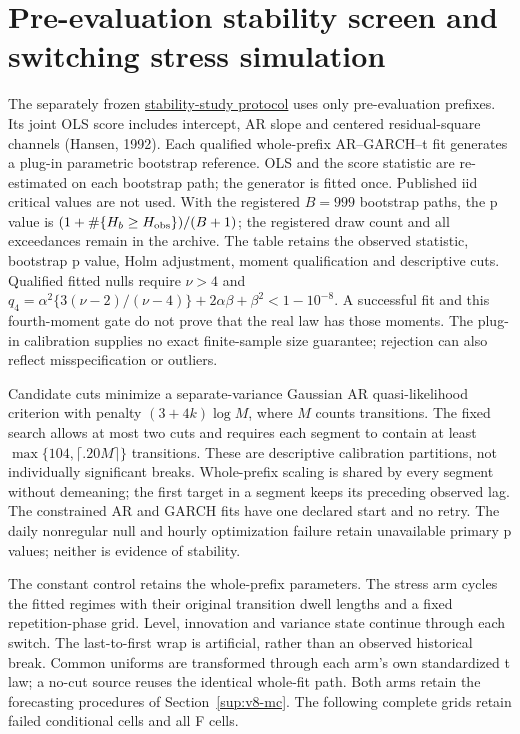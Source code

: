 \section{Pre-evaluation stability screen and switching stress simulation}\label{sup:v9-stability}

The separately frozen
\href{https://github.com/ByronLi0207/financial-mathematics-paper-20261020/blob/revision-v9/protocol/v9/nonstationarity-design.md}{stability-study protocol}
uses only pre-evaluation prefixes. Its joint OLS score includes intercept,
AR slope and centered residual-square channels (Hansen, 1992).
Each qualified whole-prefix AR--GARCH--t fit generates a plug-in parametric
bootstrap reference. OLS and the score statistic are re-estimated on each
bootstrap path; the generator is fitted once. Published iid critical values
are not used. With the registered \(B=999\) bootstrap paths, the p value is
\((1+\#\{H_b\ge H_{\rm obs}\})/(B+1)\); the registered draw count and
all exceedances remain in the archive. The table retains the observed statistic,
bootstrap p value, Holm adjustment, moment qualification and descriptive cuts.
Qualified fitted nulls require \(\nu>4\) and
\(q_4=\alpha^2\{3(\nu-2)/(\nu-4)\}+2\alpha\beta+\beta^2<1-10^{-8}\).
A successful fit and this fourth-moment gate do not prove that the real law
has those moments. The plug-in calibration supplies no exact finite-sample
size guarantee; rejection can also reflect misspecification or outliers.



Candidate cuts minimize a separate-variance Gaussian AR quasi-likelihood
criterion with penalty \((3+4k)\log M\), where \(M\) counts transitions.
The fixed search allows at most two cuts and requires each segment to contain
at least \(\max\{104,\lceil .20M\rceil\}\) transitions.
These are descriptive calibration partitions, not individually significant
breaks. Whole-prefix scaling is shared by every segment without demeaning;
the first target in a segment keeps its preceding observed lag.
The constrained AR and GARCH fits have one declared start and no retry.
The daily nonregular null and hourly optimization failure retain unavailable
primary p values; neither is evidence of stability.

The constant control retains the whole-prefix parameters. The stress arm
cycles the fitted regimes with their original transition dwell lengths and a
fixed repetition-phase grid. Level, innovation and variance state continue
through each switch. The last-to-first wrap is artificial, rather than an
observed historical break. Common uniforms are transformed through each arm's
own standardized t law; a no-cut source reuses the identical whole-fit path.
Both arms retain the forecasting procedures of Section~\ref{sup:v8-mc}.
The following complete grids retain failed conditional cells and all F cells.

